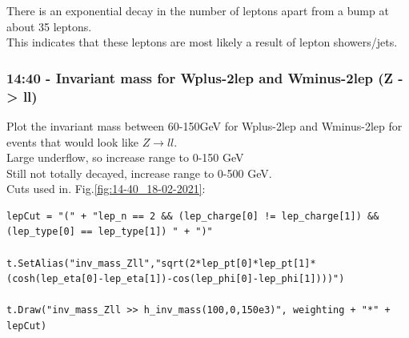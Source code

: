 
There is an exponential decay in the number of leptons apart from a bump at about 35 leptons.
\\
This indicates that these leptons are most likely a result of lepton showers/jets.


\subsubsection*{14:40 - Invariant mass for Wplus-2lep and Wminus-2lep (Z -> ll)}
Plot the invariant mass between 60-150GeV for Wplus-2lep and Wminus-2lep for events that would look like $Z \rightarrow ll$.
\\
Large underflow, so increase range to 0-150 GeV 
\\
Still not totally decayed, increase range to 0-500 GeV.
\\
Cuts used in. Fig.\ref{fig:14-40_18-02-2021}:
\begin{lstlisting}
lepCut = "(" + "lep_n == 2 && (lep_charge[0] != lep_charge[1]) &&  (lep_type[0] == lep_type[1]) " + ")"

t.SetAlias("inv_mass_Zll","sqrt(2*lep_pt[0]*lep_pt[1]*(cosh(lep_eta[0]-lep_eta[1])-cos(lep_phi[0]-lep_phi[1])))")
  
t.Draw("inv_mass_Zll >> h_inv_mass(100,0,150e3)", weighting + "*" + lepCut)
\end{lstlisting}
